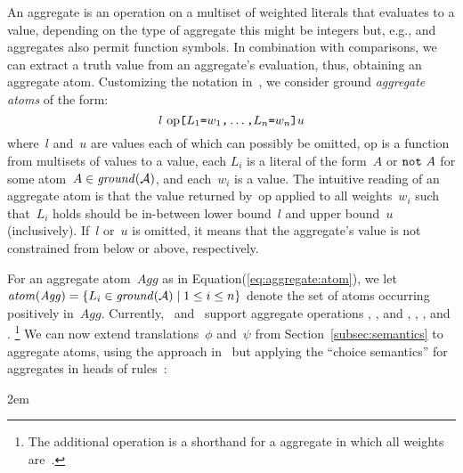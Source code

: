 
An aggregate is an operation on a multiset of weighted literals that evaluates to a value,
depending on the type of aggregate this might be integers but, 
e.g.,  and  aggregates also permit function symbols.
In combination with comparisons, we can extract a truth value from
an aggregate's evaluation, thus, obtaining an aggregate atom.
Customizing the notation in~\cite{ferraris05a},
we consider ground \emph{aggregate atoms} of the form:
%
\begin{equation}\label{eq:aggregate:atom}
  l~ 
  \mathrm{op} 
  \texttt{[}
  L_1\texttt{=}w_1\texttt{,}
  \dots\texttt{,}
  L_n\texttt{=}w_n
  \texttt{]}
  u
\end{equation}
%
where~$l$ and~$u$ are values each of which can possibly be omitted,
$\mathrm{op}$ is a function from multisets of values to a value,
each $L_i$ is a literal of the form~$A$ or $\texttt{not}~A$
for some atom~$A\in\mathit{ground}(\mathcal{A})$,
and each~$w_i$ is a value.
The intuitive reading of an aggregate atom is that the value returned by~$\mathrm{op}$
applied to all weights~$w_i$ such that~$L_i$ holds should be in-between
lower bound~$l$ and upper bound~$u$ (inclusively).
If~$l$ or~$u$ is omitted,
it means that the aggregate's value is not constrained from below or above,
respectively.

For an aggregate atom~$\mathit{Agg}$ as in Equation(\ref{eq:aggregate:atom}),
we let $\atom{\mathit{Agg}}=\{L_i\in\nolinebreak\ground{\mathcal{A}}\mid 1\leq i\leq n\}$
denote the set of atoms occurring positively in~$\mathit{Agg}$.
Currently, \gringo\ and \clingo\ support aggregate operations
, , and , , , and .%
\footnote{%
  The additional operation  is a shorthand for a 
  aggregate in which all weights are~.}
We can now extend translations~$\phi$ and~$\psi$ from Section~\ref{subsec:semantics}
to aggregate atoms, 
using the approach in~\cite{ferraris05a} but
applying the ``choice semantics'' for aggregates
in heads of rules~\cite{ferlif05a,siniso02a}:%
 
\newcommand\shiftleft{\kern\leftshift&\kern-\leftshift}

\newlength{\leftshift} 
\setlength{\leftshift} {2em}

